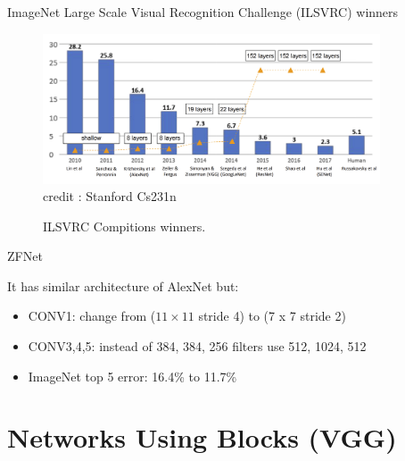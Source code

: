 
\begin{vbframe}{ImageNet Large Scale Visual Recognition Challenge (ILSVRC) winners}

    \begin{figure}
        \centering
        \includegraphics[width=10cm]{plots/moderncnn/imagenet.png}
            \tiny{\\ credit : Stanford Cs231n}
        \caption{ILSVRC Compitions winners.}
    \end{figure}
    
\end{vbframe}

\begin{vbframe}{ZFNet}

It has similar architecture of AlexNet but:
       \begin{itemize}
          \item CONV1: change from ($11 \times 11$ stride 4) to (7 x 7 stride 2)
          \item CONV3,4,5: instead of 384, 384, 256 filters use 512, 1024, 512
          \item ImageNet top 5 error: 16.4\% to 11.7\%
       \end{itemize}

\end{vbframe}
    

\section{Networks Using Blocks (VGG)}

